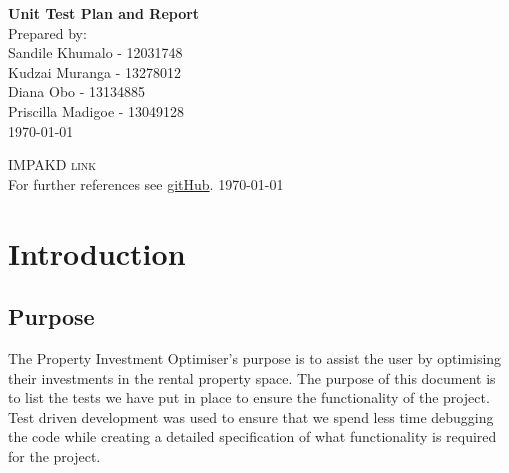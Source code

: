 \documentclass[a4paper,12pt]{article}
\begin{document}
\begin{titlepage}
\begin{center}


{ \huge \bfseries Unit Test Plan and Report}\\[4cm]


\hfill{\large Prepared by:}\\[0.5cm]
\hfill{\large Sandile Khumalo - 12031748}\\[0.1cm]
\hfill{\large Kudzai Muranga - 13278012}\\[0.1cm]
\hfill{\large Diana Obo - 13134885}\\[0.1cm]
\hfill{\large Priscilla Madigoe - 13049128}\\[0.5cm]
\hfill{\large \today}

\end{center}
\end{titlepage}
\renewcommand{\thesection}{\arabic{section}}

\newpage
\begin{center}
\textsc{\Large IMPAKD link}\\[0.5cm]
For further references see \href{https://github.com/u13278012/IMPAKD/}{gitHub}.
\today
\end{center}
\newpage
\tableofcontents{}

\setcounter{secnumdepth}{4}

\newpage
\section{Introduction}
\subsection{Purpose}
The Property Investment Optimiser's purpose is to assist the user by optimising their investments in the rental property space. The purpose of this document is to list the tests we have put in place to ensure the functionality of the project. Test driven development was used to ensure that we spend less time debugging the code while creating a detailed specification of what functionality is required for the project.
\end{document}
